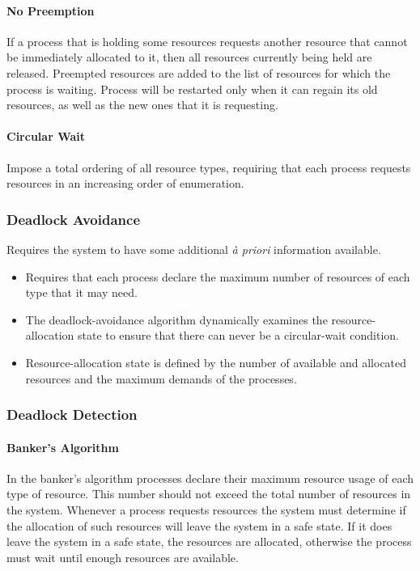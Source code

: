 \paragraph{No Preemption}
If a process that is holding some resources requests another resource that cannot be immediately allocated to it,
then all resources currently being held are released.
Preempted resources are added to the list of resources for which the process is waiting.
Process will be restarted only when it can regain its old resources, as well as the new ones that it is requesting.

\paragraph{Circular Wait}
Impose a total ordering of all resource types, requiring that each process requests resources in an increasing order of enumeration.

\subsubsection{Deadlock Avoidance}

Requires the system to have some additional \textit{à priori} information available.
\begin{itemize}
    \item Requires that each process declare the maximum number of resources of each type that it may need.
    \item The deadlock-avoidance algorithm dynamically examines the resource-allocation state to ensure that there can never be a circular-wait condition.
    \item Resource-allocation state is defined by the number of available and allocated resources and the maximum demands of the processes.
\end{itemize}

\subsubsection{Deadlock Detection}

\paragraph{Banker's Algorithm}
In the banker's algorithm processes declare their maximum resource usage of each type of resource.
This number should not exceed the total number of resources in the system.
Whenever a process requests resources the system must determine if the allocation of such resources will leave the system in a safe state.
If it does leave the system in a safe state, the resources are allocated, otherwise the process must wait until enough resources are available.

